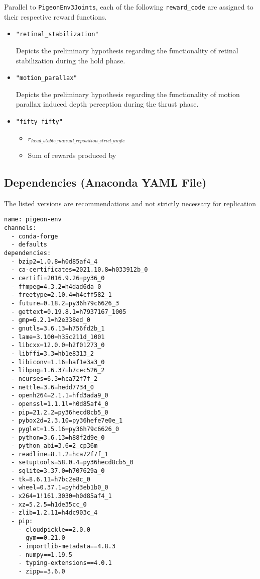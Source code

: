 \begin{itemize}
Parallel to \lstinline|PigeonEnv3Joints|, each of the following \lstinline|reward_code| are assigned to their respective reward functions.
\begin{itemize}
  \item \lstinline|"retinal_stabilization"|
      \begin{description}
          Depicts the preliminary hypothesis regarding the functionality of retinal stabilization during the hold phase.
      \end{description}
  \item \lstinline|"motion_parallax"|
      \begin{description}
          Depicts the preliminary hypothesis regarding the functionality of motion parallax induced depth perception during the thrust phase.
      \end{description}
  \item \lstinline|"fifty_fifty"|
      \begin{itemize}
          \item $r_{head\_stable\_manual\_reposition\_strict\_angle}$
          \item Sum of rewards produced by
      \end{itemize}
\end{itemize}

\subsection{Dependencies (Anaconda YAML File)}
The listed versions are recommendations and not strictly necessary for replication
\begin{lstlisting}
name: pigeon-env
channels:
  - conda-forge
  - defaults
dependencies:
  - bzip2=1.0.8=h0d85af4_4
  - ca-certificates=2021.10.8=h033912b_0
  - certifi=2016.9.26=py36_0
  - ffmpeg=4.3.2=h4dad6da_0
  - freetype=2.10.4=h4cff582_1
  - future=0.18.2=py36h79c6626_3
  - gettext=0.19.8.1=h7937167_1005
  - gmp=6.2.1=h2e338ed_0
  - gnutls=3.6.13=h756fd2b_1
  - lame=3.100=h35c211d_1001
  - libcxx=12.0.0=h2f01273_0
  - libffi=3.3=hb1e8313_2
  - libiconv=1.16=haf1e3a3_0
  - libpng=1.6.37=h7cec526_2
  - ncurses=6.3=hca72f7f_2
  - nettle=3.6=hedd7734_0
  - openh264=2.1.1=hfd3ada9_0
  - openssl=1.1.1l=h0d85af4_0
  - pip=21.2.2=py36hecd8cb5_0
  - pybox2d=2.3.10=py36hefe7e0e_1
  - pyglet=1.5.16=py36h79c6626_0
  - python=3.6.13=h88f2d9e_0
  - python_abi=3.6=2_cp36m
  - readline=8.1.2=hca72f7f_1
  - setuptools=58.0.4=py36hecd8cb5_0
  - sqlite=3.37.0=h707629a_0
  - tk=8.6.11=h7bc2e8c_0
  - wheel=0.37.1=pyhd3eb1b0_0
  - x264=1!161.3030=h0d85af4_1
  - xz=5.2.5=h1de35cc_0
  - zlib=1.2.11=h4dc903c_4
  - pip:
    - cloudpickle==2.0.0
    - gym==0.21.0
    - importlib-metadata==4.8.3
    - numpy==1.19.5
    - typing-extensions==4.0.1
    - zipp==3.6.0
\end{lstlisting}


\end{itemize}
